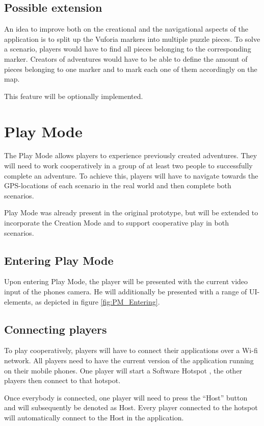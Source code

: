 \documentclass{sigchi-ext}
\begin{document}
\subsection{Possible extension}

An idea to improve both on the creational and the navigational aspects of the application is to split up the Vuforia markers into multiple puzzle pieces. To solve a scenario, players would have to find all pieces belonging to the corresponding marker. Creators of adventures would have to be able to define the amount of pieces belonging to one marker and to mark each one of them accordingly on the map.

This feature will be optionally implemented.

\section{Play Mode}
\label{sec:Play}


The Play Mode allows players to experience previously created adventures. They will need to work cooperatively in a group of at least two people to successfully complete an adventure. To achieve this, players will have to navigate towards the GPS-locations of each scenario in the real world and then complete both scenarios. 

Play Mode was already present in the original prototype, but will be extended to incorporate the Creation Mode and to support cooperative play in both scenarios.

\subsection{Entering Play Mode}

Upon entering Play Mode, the player will be presented with the current video input of the phones camera. He will additionally be presented with a range of UI-elements, as depicted in figure \ref{fig:PM_Entering}.


\subsection{Connecting players}
To play cooperatively, players will have to connect their applications over a Wi-fi network. All players need to have the current version of the application running on their mobile phones. One player will start a Software Hotspot \cite{desc:hotspot}, the other players then connect to that hotspot.

Once everybody is connected, one player will need to press the ``Host'' button and will subsequently be denoted as Host. Every player connected to the hotspot will automatically connect to the Host in the application. 
\end{document}
